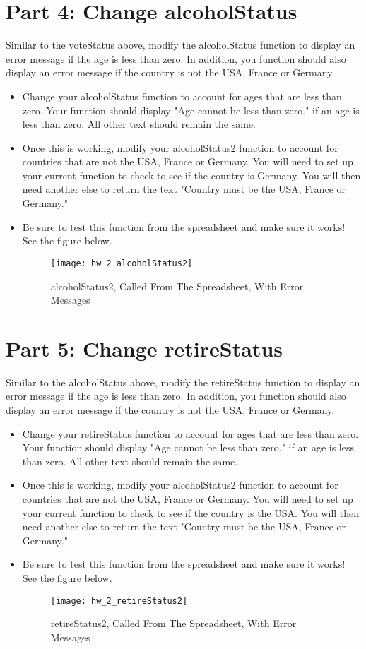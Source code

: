 \documentclass{article}
\begin{document}
\section*{Part 4: Change alcoholStatus}
Similar to the voteStatus above, modify the alcoholStatus function to display an error message if the age is less than zero.  In addition, you function should also display an error message if the country is not the USA, France or Germany.
\begin{itemize}
    \item Change your alcoholStatus function to account for ages that are less than zero.  Your function should display "Age cannot be less than zero." if an age is less than zero.  All other text should remain the same.
    \item Once this is working, modify your alcoholStatus2 function to account for countries that are not the USA, France or Germany.  You will need to set up your current function to check to see if the country is Germany.  You will then need another else to return the text "Country must be the USA, France or Germany."
	\item Be sure to test this function from the spreadsheet and make sure it works!  See the figure below.
	\begin{figure}[H]
  		\centering
  		\texttt{[image: hw\_2\_alcoholStatus2]}
  		\caption{alcoholStatus2, Called From The Spreadsheet, With Error Messages}
	\end{figure}
\end{itemize}

\section*{Part 5: Change retireStatus}
Similar to the alcoholStatus above, modify the retireStatus function to display an error message if the age is less than zero.  In addition, you function should also display an error message if the country is not the USA, France or Germany.
\begin{itemize}
    \item Change your retireStatus function to account for ages that are less than zero.  Your function should display "Age cannot be less than zero." if an age is less than zero.  All other text should remain the same.
     \item Once this is working, modify your alcoholStatus2 function to account for countries that are not the USA, France or Germany.  You will need to set up your current function to check to see if the country is the USA.  You will then need another else to return the text "Country must be the USA, France or Germany."
	\item Be sure to test this function from the spreadsheet and make sure it works!  See the figure below.
	\begin{figure}[H]
  		\centering
  		\texttt{[image: hw\_2\_retireStatus2]}
  		\caption{retireStatus2, Called From The Spreadsheet, With Error Messages}
	\end{figure}
\end{itemize}
\end{document}
